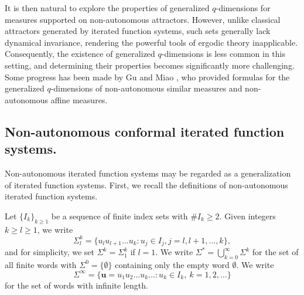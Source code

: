 \documentclass[12pt]{amsart}
\theoremstyle{plain}
\theoremstyle{definition}
\theoremstyle{remark}
\begin{document}
It is then natural to explore the properties of generalized $q$-dimensions for measures supported on non-autonomous attractors. However, unlike classical attractors generated by iterated function systems, such sets generally lack dynamical invariance, rendering the powerful tools of ergodic theory inapplicable. Consequently, the existence of generalized $q$-dimensions is less common in this setting, and determining their properties becomes significantly more challenging. Some progress has been made by Gu and Miao \cite{GM2}, who provided formulas for the generalized $q$-dimensions of non-autonomous similar measures and  non-autonomous affine measures. 

	\subsection{Non-autonomous conformal iterated function systems.}

Non-autonomous iterated function systems may be regarded as a generalization of iterated function systems. First, we recall the definitions of  non-autonomous iterated function systems.

Let $\{I_{k}\}_{k\geq 1}$ be a sequence of finite index sets with $\# I_k\geq 2$. Given integers $k\ge l \ge 1$,  we write
\begin{equation}\label{finite I}
\Sigma_l^{k}=\{u_{l}u_{l+1}\ldots u_{k}: u_{j}\in I_j, j=l,l+1,\ldots, k \},
\end{equation}
and for simplicity, we set $ \Sigma^k=\Sigma^{k}_1 $ if $l=1$. We write $\Sigma^{*}=\bigcup _{k=0}^{\infty }\Sigma^{k}$ for the set of all finite words with $
\Sigma^{0}=\{\emptyset \}$ containing only the empty word $\emptyset$. We write
\begin{equation}\label{def_infSeqS}
\Sigma^{\infty}=\{\mathbf{u}=u_{1}u_{2}\ldots u_{k}\ldots : u_{k}\in I_k ,\  k=1,2,\ldots \}
\end{equation}
for the set of words with infinite length.
\end{document}
